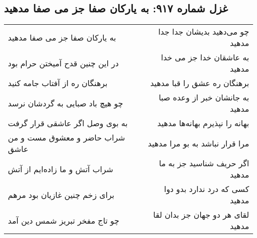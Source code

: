 \begin{center}
\section*{غزل شماره ۹۱۷: به یارکان صفا جز می صفا مدهید}
\label{sec:0917}
\begin{longtable}{l p{0.5cm} r}
به یارکان صفا جز می صفا مدهید
&&
چو می‌دهید بدیشان جدا جدا مدهید
\\
در این چنین قدح آمیختن حرام بود
&&
به عاشقان خدا جز می خدا مدهید
\\
برهنگان ره از آفتاب جامه کنید
&&
برهنگان ره عشق را قبا مدهید
\\
چو هیچ باد صبایی به گردشان نرسد
&&
به جانشان خبر از وعده صبا مدهید
\\
به بوی وصل اگر عاشقی قرار گرفت
&&
بهانه را نپذیرم بهانه‌ها مدهید
\\
شراب حاضر و معشوق مست و من عاشق
&&
مرا قرار نباشد به بو مرا مدهید
\\
شراب آتش و ما زاده‌ایم از آتش
&&
اگر حریف شناسید جز به ما مدهید
\\
برای زخم چنین غازیان بود مرهم
&&
کسی که درد ندارد بدو دوا مدهید
\\
چو تاج مفخر تبریز شمس دین آمد
&&
لقای هر دو جهان جز بدان لقا مدهید
\\
\end{longtable}
\end{center}
